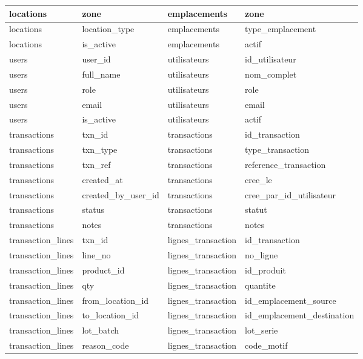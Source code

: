 \documentclass[a4paper,11pt]{article}
\begin{document}
\begin{longtable}{|l|l|l|l|}
 locations & zone & emplacements & zone \\ \hline
\rowcolor{rowgray} locations & location\_type & emplacements & type\_emplacement \\ \hline
 locations & is\_active & emplacements & actif \\ \hline
\rowcolor{rowgray} users & user\_id & utilisateurs & id\_utilisateur \\ \hline
 users & full\_name & utilisateurs & nom\_complet \\ \hline
\rowcolor{rowgray} users & role & utilisateurs & role \\ \hline
 users & email & utilisateurs & email \\ \hline
\rowcolor{rowgray} users & is\_active & utilisateurs & actif \\ \hline
 transactions & txn\_id & transactions & id\_transaction \\ \hline
\rowcolor{rowgray} transactions & txn\_type & transactions & type\_transaction \\ \hline
 transactions & txn\_ref & transactions & reference\_transaction \\ \hline
\rowcolor{rowgray} transactions & created\_at & transactions & cree\_le \\ \hline
 transactions & created\_by\_user\_id & transactions & cree\_par\_id\_utilisateur \\ \hline
\rowcolor{rowgray} transactions & status & transactions & statut \\ \hline
 transactions & notes & transactions & notes \\ \hline
\rowcolor{rowgray} transaction\_lines & txn\_id & lignes\_transaction & id\_transaction \\ \hline
 transaction\_lines & line\_no & lignes\_transaction & no\_ligne \\ \hline
\rowcolor{rowgray} transaction\_lines & product\_id & lignes\_transaction & id\_produit \\ \hline
 transaction\_lines & qty & lignes\_transaction & quantite \\ \hline
\rowcolor{rowgray} transaction\_lines & from\_location\_id & lignes\_transaction & id\_emplacement\_source \\ \hline
 transaction\_lines & to\_location\_id & lignes\_transaction & id\_emplacement\_destination \\ \hline
\rowcolor{rowgray} transaction\_lines & lot\_batch & lignes\_transaction & lot\_serie \\ \hline
 transaction\_lines & reason\_code & lignes\_transaction & code\_motif \\ \hline

\end{longtable}
\end{document}
